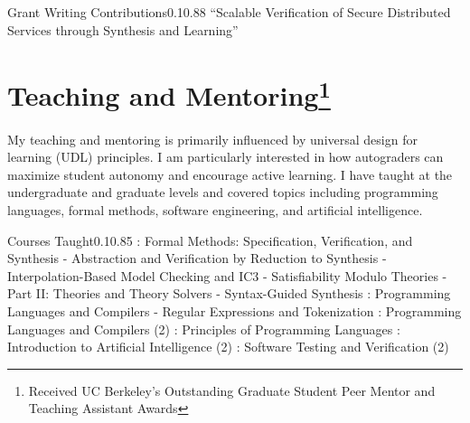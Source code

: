 \documentclass{federico_cv}
\begin{document}
\begin{tblSubSection}{Grant Writing Contributions}{0.1}{0.88}
{``Scalable Verification of Secure Distributed Services through Synthesis and Learning''}
\end{tblSubSection}


\section{Teaching and Mentoring\protect\footnote{Received UC Berkeley's Outstanding Graduate Student Peer Mentor and Teaching Assistant Awards}}

My teaching and mentoring is primarily influenced by universal design for
learning (UDL) principles. I am particularly interested in how autograders can
maximize student autonomy and encourage active learning. I have taught at
the undergraduate and graduate levels and covered topics including programming
languages, formal methods, software engineering, and artificial intelligence.


\begin{tblSubSection}{Courses Taught}{0.1}{0.85}
{: Formal Methods: Specification, Verification, and Synthesis}
{\quad - Abstraction and Verification by Reduction to Synthesis} 
{\quad - Interpolation-Based Model Checking and IC3}
{\quad - Satisfiability Modulo Theories - Part II: Theories and Theory Solvers}
{\quad - Syntax-Guided Synthesis} 
{: Programming Languages and Compilers}
{\quad - Regular Expressions and Tokenization}
{: Programming Languages and Compilers (2)}
{: Principles of Programming Languages} 
{: Introduction to Artificial Intelligence (2)}
{: Software Testing and Verification (2)}
\end{tblSubSection}
\end{document}
